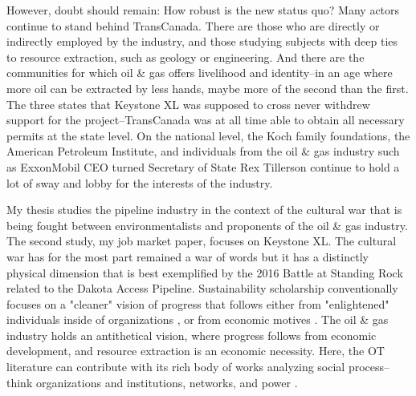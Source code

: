 However, doubt should remain: How robust is the new status quo? Many actors continue to stand behind TransCanada. There are those who are directly or indirectly employed by the industry, and those studying subjects with deep ties to resource extraction, such as geology or engineering. And there are the communities for which oil \& gas offers livelihood and identity--in an age where more oil can be extracted by less hands, maybe more of the second than the first. 
The three states that Keystone XL was supposed to cross never withdrew support for the project--TransCanada was at all time able to obtain all necessary permits at the state level. On the national level, the Koch family foundations, the American Petroleum Institute, and individuals from the oil \& gas industry such as ExxonMobil CEO turned Secretary of State Rex Tillerson continue to hold a lot of sway and lobby for the interests of the industry.

My thesis studies the pipeline industry in the context of the cultural war that is being fought between environmentalists and proponents of the oil \& gas industry. The second study, my job market paper, focuses on Keystone XL. The cultural war has for the most part remained a war of words but it has a distinctly physical dimension that is best exemplified by the 2016 Battle at Standing Rock related to the Dakota Access Pipeline. 
Sustainability scholarship conventionally focuses on a "cleaner" vision of progress that follows either from "enlightened" individuals inside of organizations \citep[e.g.,][]{Howard-Grenville2017}, or from economic motives \citep[e.g.,][]{Flammer2015}. The oil \& gas industry holds an antithetical vision, where progress follows from economic development, and resource extraction is an economic necessity. Here, the OT literature can contribute with its rich body of works analyzing social process--think organizations and institutions, networks, and power \citep{Davis2015,Ergene2020}.



